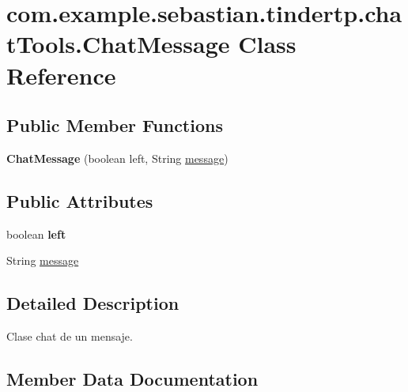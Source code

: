 \hypertarget{classcom_1_1example_1_1sebastian_1_1tindertp_1_1chatTools_1_1ChatMessage}{}\section{com.\+example.\+sebastian.\+tindertp.\+chat\+Tools.\+Chat\+Message Class Reference}
\label{classcom_1_1example_1_1sebastian_1_1tindertp_1_1chatTools_1_1ChatMessage}
\subsection*{Public Member Functions}
\begin{DoxyCompactItemize}
\item 
{\bfseries Chat\+Message} (boolean left, String \hyperlink{classcom_1_1example_1_1sebastian_1_1tindertp_1_1chatTools_1_1ChatMessage_aee5e1e99652c0f954aec7f99975c2714}{message})\hypertarget{classcom_1_1example_1_1sebastian_1_1tindertp_1_1chatTools_1_1ChatMessage_ac0b763b632fde85f61521a2fbdff51eb}{}\label{classcom_1_1example_1_1sebastian_1_1tindertp_1_1chatTools_1_1ChatMessage_ac0b763b632fde85f61521a2fbdff51eb}

\end{DoxyCompactItemize}
\subsection*{Public Attributes}
\begin{DoxyCompactItemize}
\item 
boolean {\bfseries left}\hypertarget{classcom_1_1example_1_1sebastian_1_1tindertp_1_1chatTools_1_1ChatMessage_a82d79bdbea3d10a7871db563a03d94ab}{}\label{classcom_1_1example_1_1sebastian_1_1tindertp_1_1chatTools_1_1ChatMessage_a82d79bdbea3d10a7871db563a03d94ab}

\item 
String \hyperlink{classcom_1_1example_1_1sebastian_1_1tindertp_1_1chatTools_1_1ChatMessage_aee5e1e99652c0f954aec7f99975c2714}{message}
\end{DoxyCompactItemize}


\subsection{Detailed Description}
Clase chat de un mensaje. 

\subsection{Member Data Documentation}
